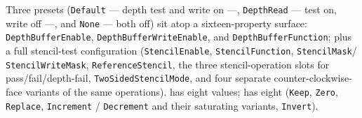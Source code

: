 Three presets (\texttt{Default} --- depth test and write on ---,
\texttt{DepthRead} --- test on, write off ---, and \texttt{None} --- both off) sit atop a
sixteen-property surface: \texttt{DepthBufferEnable}, \texttt{DepthBufferWriteEnable}, and
\texttt{DepthBufferFunction}; plus a full stencil-test configuration
(\texttt{StencilEnable}, \texttt{StencilFunction}, \texttt{StencilMask}/%
\texttt{StencilWriteMask}, \texttt{ReferenceStencil}, the three stencil-operation slots for
pass/fail/depth-fail, \texttt{TwoSidedStencilMode}, and four separate counter-clockwise-face
variants of the same operations).  has eight values;
 has eight (\texttt{Keep}, \texttt{Zero}, \texttt{Replace},
\texttt{Increment} / \texttt{Decrement} and their saturating variants, \texttt{Invert}).

